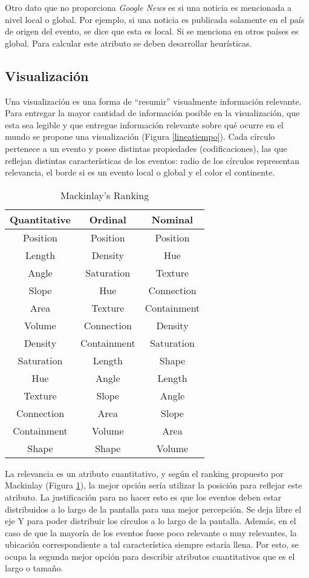\documentclass[10pt]{article}
\begin{document}
	Otro dato que no proporciona \emph{Google News} es si una noticia es mencionada a nivel local o global. Por ejemplo, si una noticia es publicada solamente en el país de origen del evento, se dice que esta es local. Si se menciona en otros países es global. Para calcular este atributo se deben desarrollar heurísticas.

\subsection{Visualización}	

	Una visualización es una forma de ``resumir'' visualmente información relevante. Para entregar la mayor cantidad de información posible en la visualización, que esta sea legible y que entregue información relevante sobre qué ocurre en el mundo se propone una visualización (Figura \ref{lineatiempo}). Cada círculo pertenece a un evento y posee distintas propiedades (codificaciones), las que reflejan distintas características de los eventos: radio de los círculos representan relevancia, el borde si es un evento local o global y el color el continente.

\begin{table}
\centering
\begin{tabular}{|c|c|c|}
\hline
Quantitative & Ordinal & Nominal\\
\hline
Position & Position & Position\\
Length & Density & Hue\\
Angle & Saturation & Texture\\
Slope & Hue & Connection\\
Area & Texture & Containment\\
Volume & Connection & Density\\
Density & Containment & Saturation\\
Saturation & Length & Shape\\
Hue & Angle & Length\\
Texture & Slope & Angle\\
Connection & Area & Slope\\
Containment & Volume & Area \\
Shape & Shape & Volume\\
\hline
\end{tabular}
\caption{Mackinlay's Ranking\cite{mackinlay}}
\label{tab:mackinlay}
\end{table}

	La relevancia es un atributo cuantitativo, y según el ranking propuesto por Mackinlay (Figura \ref{tab:mackinlay}), la mejor opción sería utilizar la posición para reflejar este atributo. La justificación para no hacer esto es que los eventos deben estar distribuidos a lo largo de la pantalla para una mejor percepción. Se deja libre el eje Y para poder distribuir los círculos a lo largo de la pantalla. Además, en el caso de que la mayoría de los eventos fuese poco relevante o muy relevantes, la ubicación correspondiente a tal característica siempre estaría llena. Por esto, se ocupa la segunda mejor opción para describir atributos cuantitativos que es el largo o tamaño.
	
\end{document}

